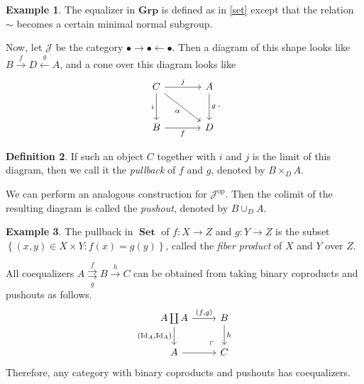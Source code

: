 \documentclass[10pt,letterpaper,cm]{nupset}
\theoremstyle{definition}
\newtheorem{definition}{Definition}[section]
\newtheorem{exmp}[definition]{Example}
\theoremstyle{theorem}
\theoremstyle{remark}
\newcommand{\1}{\mathbf{1}}
\renewcommand{\j}{\mathscr{J}}
\newcommand{\0}{\vec 0}
\DeclareMathOperator{\id}{Id}
\DeclareMathOperator{\op}{op}
\DeclareMathOperator{\set}{\mathbf{Set}}
\begin{document}
\begin{exmp}
The equalizer in $\mathbf{Grp}$ is defined as in \cref{set} except that the relation $\sim$ becomes a certain minimal normal subgroup.
\end{exmp}

\smallskip

Now, let $\j$ be the category $\bullet \rightarrow \bullet \leftarrow \bullet$. Then a diagram of this shape looks like $B \overset{f}{\longrightarrow} D \overset{g}{\longleftarrow} A$, and a cone over this diagram looks like 
\[
\begin{tikzcd}[row sep=large, column sep=large]
C \arrow[to=Z, "i ", swap] \arrow[to=2-2, dr, "\alpha", swap]
& A \arrow[to=2-2, "g "] \\
|[alias=Z]| B  \arrow[to=2-2, "f"'] 
& D
\arrow[from=ul, to=1-2, "j "]
\end{tikzcd}.
\]

\begin{definition}
If such an object $C$ together with $i$ and $j$ is the limit of this diagram, then we call it the \textit{pullback} of $f$ and $g$, denoted by $B \times_{D} A$.
\end{definition}


We can perform an analogous construction for $\j^{\op}$. Then the colimit of the resulting diagram is called the \textit{pushout}, denoted by $B \cup_{D} A$.


\begin{exmp}
The pullback in $\set$ of $f: X \to Z$ and $g: Y \to Z$ is the subset $\left\{\left(x,y\right) \in X \times Y : f(x) = g(y)\right\}$, called the \textit{fiber product} of $X$ and $Y$ over $Z$.
\end{exmp}

\smallskip

All coequalizers $A \overset{f}{\underset{g}{\rightrightarrows}} B \overset{h}{\longrightarrow} C$ can be obtained from taking binary coproducts and pushouts as follows.
\[
\begin{tikzcd}
A\coprod A \arrow[d, "{\left(\id_A, \id_A\right)}"']
 \arrow[dr, phantom, "\ulcorner", very near end]
 \arrow[r, "{\left(f,g\right)}"] & B \arrow[d, "h"] \\
A \arrow[r]                                                                      & C               
\end{tikzcd}
\] Therefore, any category with binary coproducts and pushouts has coequalizers.

   {\bigRelbar\bigRelbar{\bigtwoarrowsleft\rightarrow\rightarrow}}
\end{document}
